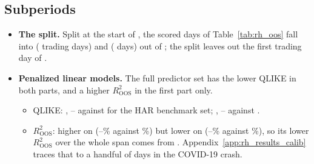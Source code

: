 \subsection{Subperiods}
\label{app:rh_results_sub}
\begin{itemize}
\item \textbf{The split.} Split at the start of \rhorSubBStartYear, the scored days of Table~\ref{tab:rh_oos} fall
  into \rhorSubALabel{} (\rhorSubADays{} trading days) and \rhorSubBLabel{} (\rhorSubBDays{} days) out of \rhorDays;
  the split leaves out the first trading day of \rhorSubBStartYear.
\item \textbf{Penalized linear models.} The full predictor set has the lower QLIKE in both parts, and a higher
  $R^2_{\mathrm{OOS}}$ in the first part only.
  \begin{itemize}
  \item QLIKE: \rhorSubALabel, \rhorSubAQlikeAfMin--\rhorSubAQlikeAfMax{} against \rhorSubAQlikeHar{} for the HAR
    benchmark set; \rhorSubBLabel, \rhorSubBQlikeAfMin--\rhorSubBQlikeAfMax{} against \rhorSubBQlikeHar.
  \item $R^2_{\mathrm{OOS}}$: higher on \rhorSubALabel{} (\rhorSubARoosAfMin--\rhorSubARoosAfMax\% against
    \rhorSubARoosHar\%) but lower on \rhorSubBLabel{} (\rhorSubBRoosAfMin--\rhorSubBRoosAfMax\% against
    \rhorSubBRoosHar\%), so its lower $R^2_{\mathrm{OOS}}$ over the whole span comes from \rhorSubBLabel.
    Appendix~\ref{app:rh_results_calib} traces that to a handful of days in the COVID-19 crash.
  \end{itemize}
\end{itemize}

